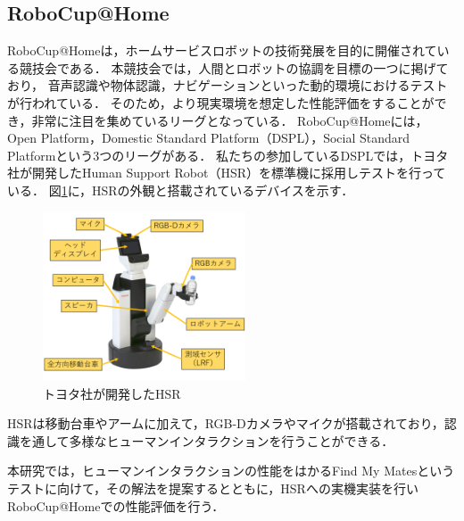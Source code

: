 \documentclass[a4j]{jarticle}
\begin{document}
\subsection{RoboCup@Home}
RoboCup@Homeは，ホームサービスロボットの技術発展を目的に開催されている競技会である．
本競技会では，人間とロボットの協調を目標の一つに掲げており，
音声認識や物体認識，ナビゲーションといった動的環境におけるテストが行われている．
そのため，より現実環境を想定した性能評価をすることができ，非常に注目を集めているリーグとなっている．
RoboCup@Homeには，Open Platform，Domestic Standard Platform（DSPL），Social Standard Platformという3つのリーグがある．
私たちの参加しているDSPLでは，トヨタ社が開発したHuman Support Robot（HSR）を標準機に採用しテストを行っている．
図\ref{overview_hsr}に，HSRの外観と搭載されているデバイスを示す．
\begin{figure}[ht]
  \centering
  \includegraphics[width=6cm]{images/hsr/hsr_explain_ja.png}
  \caption{トヨタ社が開発したHSR}
  \label{overview_hsr}
\end{figure}
HSRは移動台車やアームに加えて，RGB-Dカメラやマイクが搭載されており，認識を通して多様なヒューマンインタラクションを行うことができる．

本研究では，ヒューマンインタラクションの性能をはかるFind My Matesというテストに向けて，その解法を提案するとともに，HSRへの実機実装を行いRoboCup@Homeでの性能評価を行う．
\end{document}

